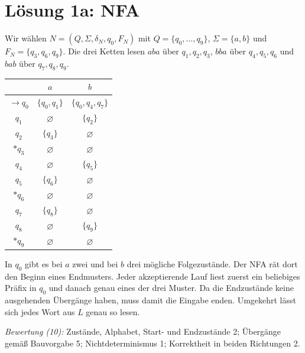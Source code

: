 \documentclass[11pt,a4paper]{article}
\begin{document}
\section*{Lösung 1a: NFA}
Wir wählen $N=(Q,\Sigma,\delta_N,q_0,F_N)$ mit
$Q=\{q_0,\ldots,q_9\}$, $\Sigma=\{a,b\}$ und $F_N=\{q_3,q_6,q_9\}$.
Die drei Ketten lesen $aba$ über $q_1,q_2,q_3$, $bba$ über $q_4,q_5,q_6$
und $bab$ über $q_7,q_8,q_9$.
\begin{center}
\begin{tabular}{c|cc}
 & $a$ & $b$\\\hline
$\to q_0$ & $\{q_0,q_1\}$ & $\{q_0,q_4,q_7\}$\\
$q_1$ & $\varnothing$ & $\{q_2\}$\\
$q_2$ & $\{q_3\}$ & $\varnothing$\\
$*q_3$ & $\varnothing$ & $\varnothing$\\
$q_4$ & $\varnothing$ & $\{q_5\}$\\
$q_5$ & $\{q_6\}$ & $\varnothing$\\
$*q_6$ & $\varnothing$ & $\varnothing$\\
$q_7$ & $\{q_8\}$ & $\varnothing$\\
$q_8$ & $\varnothing$ & $\{q_9\}$\\
$*q_9$ & $\varnothing$ & $\varnothing$
\end{tabular}
\end{center}
In $q_0$ gibt es bei $a$ zwei und bei $b$ drei mögliche Folgezustände.
Der NFA rät dort den Beginn eines Endmusters. Jeder akzeptierende Lauf
liest zuerst ein beliebiges Präfix in $q_0$ und danach genau eines der drei
Muster. Da die Endzustände keine ausgehenden Übergänge haben, muss damit
die Eingabe enden. Umgekehrt lässt sich jedes Wort aus $L$ genau so lesen.

\textit{Bewertung (10):} Zustände, Alphabet, Start- und Endzustände 2;
Übergänge gemäß Bauvorgabe 5; Nichtdeterminismus 1; Korrektheit in beiden
Richtungen 2.
\end{document}
